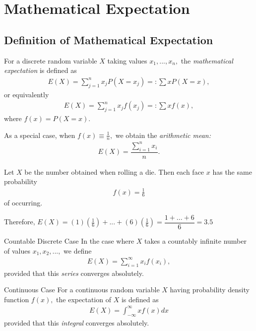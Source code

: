 \section{Mathematical Expectation}

\subsection{Definition of Mathematical Expectation}

  For a discrete random variable $X$ taking values $x_{1},...,x_{n},$ the \emph{mathematical expectation} is defined as
  \begin{align}
   \label{eq:2.9.1}
   E(X)=\sum _{j=1}^{n} x_{j}P(X=x_{j})=:\sum xP(X=x),
  \end{align}
or equivalently
  \begin{align}
   \label{eq:2.9.2}
   E(X)=\sum _{j=1}^{n} x_{j}f(x_{j})=:\sum xf(x),
  \end{align}
  where $f(x)=P(X=x).$

 As a special case, when $f(x)\equiv \frac{1}{n},$ we obtain the \emph{arithmetic mean:}
 \begin{align}
  \label{eq:2.9.3}
  E(X)=\dfrac{\sum_{i=1}^{n}x_{i}}{n}.
 \end{align}

{}
\begin{ejemplo}
 Let $X$ be the number obtained when rolling a die. Then each face $x$ has the same probability
 \begin{align}
 f(x) = \frac{1}{6}
\end{align} of occurring.

Therefore,
$E(X)= (1)\left( \frac{1}{6} \right)+...+(6)\left( \frac{1}{6} \right) = \dfrac{1+...+6}{6} = 3.5$
\end{ejemplo}

{Countable Discrete Case}
 In the case where $X$ takes a countably infinite number of values $x_{1},x_{2},...,$ we define
 \begin{align}
  E(X)=\sum_{i=1}^{\infty}x_{i}f(x_{i}),
 \end{align}
provided that this \emph{series} converges absolutely.

%
%
% 

{Continuous Case}
 For a continuous random variable $X$ having probability density function $f(x),$ the expectation of $X$ is defined as
 \begin{align}
  \label{eq:2.9.4}
  E(X)=\int_{-\infty}^{\infty}xf(x)dx
 \end{align}
provided that this \emph{integral} converges absolutely.

